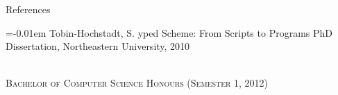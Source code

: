 \documentclass[landscape,final,a0paper,fontscale=0.277]{baposter}
\begin{document}
\begin{poster}
\begin{posterbox}[name=references,column=2,below=conclusion]{References}
  \smaller
  
  \renewcommand{\section}[2]{\vskip 0.05em}
  \begin{thebibliography}{1}\itemsep=-0.01em
    \setlength{\baselineskip}{0.4em}
    Tobin-Hochstadt, S.
    yped {S}cheme: {F}rom {S}cripts to {P}rograms
    \newblock PhD Dissertation,
    \newblock Northeastern University, 2010
  \end{thebibliography}
  \vspace{0.3em}

  \textsc{\\\smaller Bachelor of Computer Science Honours (Semester 1, 2012)}
\end{posterbox}

\end{poster}
\end{document}
